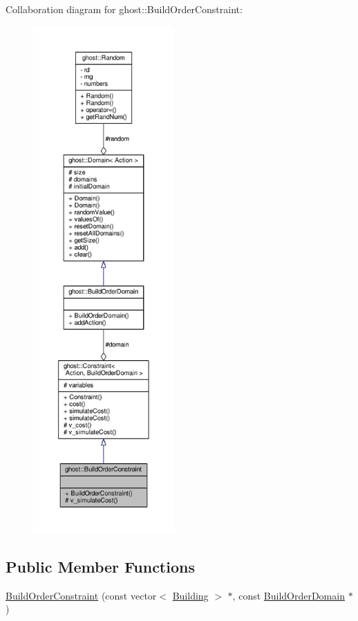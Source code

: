Collaboration diagram for ghost\-:\-:Build\-Order\-Constraint\-:
\nopagebreak
\begin{figure}[H]
\begin{center}
\leavevmode
\includegraphics[height=550pt]{classghost_1_1BuildOrderConstraint__coll__graph}
\end{center}
\end{figure}
\subsection*{Public Member Functions}
\begin{DoxyCompactItemize}
\item 
\hyperlink{classghost_1_1BuildOrderConstraint_afb712742e6e2b6e5ee37e37fe9cc898f}{Build\-Order\-Constraint} (const vector$<$ \hyperlink{classghost_1_1Building}{Building} $>$ $\ast$, const \hyperlink{classghost_1_1BuildOrderDomain}{Build\-Order\-Domain} $\ast$)
\end{DoxyCompactItemize}
